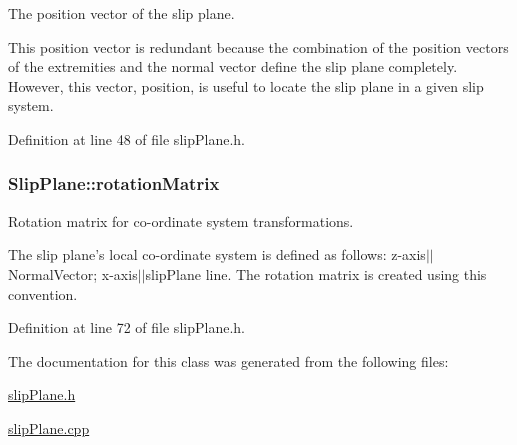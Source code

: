 \-The position vector of the slip plane. 

\-This position vector is redundant because the combination of the position vectors of the extremities and the normal vector define the slip plane completely. \-However, this vector, position, is useful to locate the slip plane in a given slip system. 

\-Definition at line 48 of file slip\-Plane.\-h.

\hypertarget{classSlipPlane_a1aa5aacccb6bb03d163a95251aa10d6c}{
\subsubsection[{rotation\-Matrix}]{ {\bf \-Slip\-Plane\-::rotation\-Matrix}}}\label{db/d25/classSlipPlane_a1aa5aacccb6bb03d163a95251aa10d6c}


\-Rotation matrix for co-\/ordinate system transformations. 

\-The slip plane's local co-\/ordinate system is defined as follows\-: z-\/axis$|$$|$\-Normal\-Vector; x-\/axis$|$$|$slip\-Plane line. \-The rotation matrix is created using this convention. 

\-Definition at line 72 of file slip\-Plane.\-h.



\-The documentation for this class was generated from the following files\-:\begin{DoxyCompactItemize}
\item 
\hyperlink{slipPlane_8h}{slip\-Plane.\-h}\item 
\hyperlink{slipPlane_8cpp}{slip\-Plane.\-cpp}\end{DoxyCompactItemize}
